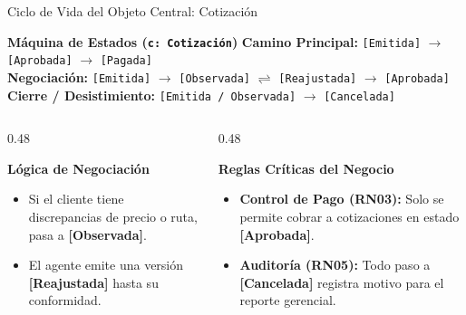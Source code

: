 \documentclass[aspectratio=169, 10pt]{beamer}
\begin{document}
\begin{frame}{Ciclo de Vida del Objeto Central: Cotización}
    \begin{block}{\textbf{Máquina de Estados (\texttt{c: Cotización})}}
        \small \centering
        \textbf{Camino Principal:} \texttt{[Emitida]} $\longrightarrow$ \texttt{[Aprobada]} $\longrightarrow$ \texttt{[Pagada]}\\[0.2cm]
        \textbf{Negociación:} \texttt{[Emitida]} $\longrightarrow$ \texttt{[Observada]} $\rightleftharpoons$ \texttt{[Reajustada]} $\longrightarrow$ \texttt{[Aprobada]}\\[0.2cm]
        \textbf{Cierre / Desistimiento:} \texttt{[Emitida / Observada]} $\longrightarrow$ \texttt{[Cancelada]}
    \end{block}
    
    \vspace{0.2cm}
    \begin{columns}[t]
        \begin{column}{0.48\textwidth}
            \begin{exampleblock}{\textbf{Lógica de Negociación}}
                \small
                \begin{itemize}
                    \item Si el cliente tiene discrepancias de precio o ruta, pasa a \textbf{[Observada]}.
                    \item El agente emite una versión \textbf{[Reajustada]} hasta su conformidad.
                \end{itemize}
            \end{exampleblock}
        \end{column}
        
        \begin{column}{0.48\textwidth}
            \begin{alertblock}{\textbf{Reglas Críticas del Negocio}}
                \small
                \begin{itemize}
                    \item \textbf{Control de Pago (RN03):} Solo se permite cobrar a cotizaciones en estado \textbf{[Aprobada]}.
                    \item \textbf{Auditoría (RN05):} Todo paso a \textbf{[Cancelada]} registra motivo para el reporte gerencial.
                \end{itemize}
            \end{alertblock}
        \end{column}
    \end{columns}
\end{frame}
\end{document}
